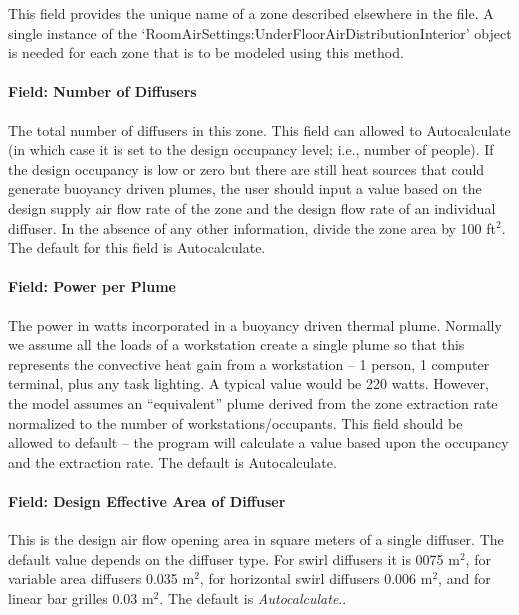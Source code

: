 This field provides the unique name of a zone described elsewhere in the file. A single instance of the `RoomAirSettings:UnderFloorAirDistributionInterior' object is needed for each zone that is to be modeled using this method.

\paragraph{Field: Number of Diffusers}\label{field-number-of-diffusers}

The total number of diffusers in this zone. This field can allowed to Autocalculate (in which case it is set to the design occupancy level; i.e., number of people). If the design occupancy is low or zero but there are still heat sources that could generate buoyancy driven plumes, the user should input a value based on the design supply air flow rate of the zone and the design flow rate of an individual diffuser. In the absence of any other information, divide the zone area by 100 ft\(^{2}\). The default for this field is Autocalculate.

\paragraph{Field: Power per Plume}\label{field-power-per-plume}

The power in watts incorporated in a buoyancy driven thermal plume. Normally we assume all the loads of a workstation create a single plume so that this represents the convective heat gain from a workstation -- 1 person, 1 computer terminal, plus any task lighting. A typical value would be 220 watts. However, the model assumes an ``equivalent'' plume derived from the zone extraction rate normalized to the number of workstations/occupants. This field should be allowed to default -- the program will calculate a value based upon the occupancy and the extraction rate. The default is Autocalculate.

\paragraph{Field: Design Effective Area of Diffuser}\label{field-design-effective-area-of-diffuser}

This is the design air flow opening area in square meters of a single diffuser. The default value depends on the diffuser type. For swirl diffusers it is 0075 m\(^{2}\), for variable area diffusers 0.035 m\(^{2}\), for horizontal swirl diffusers 0.006 m\(^{2}\), and for linear bar grilles 0.03 m\(^{2}\). The default is \emph{Autocalculate}..

